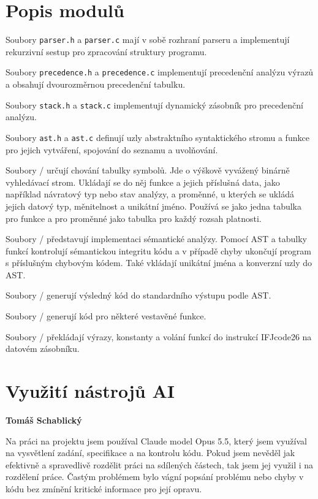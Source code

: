 \documentclass[11pt,a4paper]{article}
\begin{document}
\section{Popis modulů}

Soubory \texttt{parser.h} a \texttt{parser.c} mají v sobě rozhraní parseru a implementují rekurzivní sestup pro zpracování struktury programu.

Soubory \texttt{precedence.h} a \texttt{precedence.c} implementují precedenční analýzu výrazů a obsahují dvourozměrnou precedenční tabulku.

Soubory \texttt{stack.h} a \texttt{stack.c} implementují dynamický zásobník pro precedenční analýzu.

Soubory \texttt{ast.h} a \texttt{ast.c} definují uzly abstraktního syntaktického stromu a funkce pro jejich vytváření, spojování do seznamu a uvolňování.

Soubory / určují chování tabulky symbolů. Jde o výškově
vyvážený binárně vyhledávací strom. Ukládají se do něj funkce a jejich příslušná data, jako například návratový typ nebo stav analýzy, a proměnné, u kterých se ukládá jejich datový typ, měnitelnost a unikátní jméno. Používá se jako jedna tabulka pro funkce a pro proměnné jako tabulka pro každý rozsah platnosti.

Soubory / představují implementaci sémantické analýzy.
Pomocí AST a tabulky funkcí kontrolují sémantickou integritu kódu a v případě
chyby ukončují program s příslušným chybovým kódem. Také vkládají unikátní jména a konverzní uzly do AST.

Soubory / generují výsledný kód do standardního výstupu
podle AST. 

Soubory / generují kód pro některé vestavěné funkce.

Soubory / překládají výrazy, konstanty a volání funkcí do instrukcí IFJcode26 na datovém zásobníku.


\newpage

\section{Využití nástrojů AI}

\textbf{Tomáš Schablický}

Na práci na projektu jsem používal Claude model Opus 5.5, který jsem využíval
na vysvětlení zadání, specifikace a na kontrolu kódu. Pokud jsem nevěděl jak
efektivně a spravedlivě rozdělit práci na sdílených částech, tak jsem jej využil
i na rozdělení práce. Častým problémem bylo vágní popsání problému nebo chyby
v kódu bez zmínění kritické informace pro její opravu.
\end{document}
